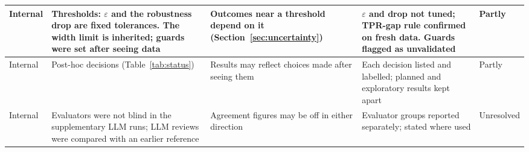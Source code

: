 \begin{table}[!htbp]
\begin{tabularx}{\textwidth}{|>{\raggedright\arraybackslash}p{1.6cm}|>{\raggedright\arraybackslash}p{3.5cm}|>{\raggedright\arraybackslash}p{3.3cm}|>{\raggedright\arraybackslash}p{3.2cm}|>{\raggedright\arraybackslash}p{1.5cm}|}
Internal & Thresholds: $\varepsilon$ and the robustness drop are fixed tolerances. The width limit is inherited; guards were set after seeing data & Outcomes near a threshold depend on it (Section~\ref{sec:uncertainty}) & $\varepsilon$ and drop not tuned; TPR-gap rule confirmed on fresh data. Guards flagged as unvalidated & Partly\\ \hline
Internal & Post-hoc decisions (Table~\ref{tab:status}) & Results may reflect choices made after seeing them & Each decision listed and labelled; planned and exploratory results kept apart & Partly\\ \hline
Internal & Evaluators were not blind in the supplementary LLM runs; LLM reviews were compared with an earlier reference & Agreement figures may be off in either direction & Evaluator groups reported separately; stated where used & Unresolved\\
\hline
\end{tabularx}
\end{table}

